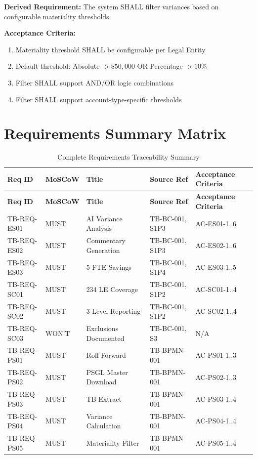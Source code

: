 \textbf{Derived Requirement:} The system SHALL filter variances based on 
configurable materiality thresholds.

\textbf{Acceptance Criteria:}
\begin{enumerate}[label=AC-PS05-\arabic*:]
    \item Materiality threshold SHALL be configurable per Legal Entity
    \item Default threshold: Absolute $> \$50,000$ OR Percentage $> 10\%$
    \item Filter SHALL support AND/OR logic combinations
    \item Filter SHALL support account-type-specific thresholds
\end{enumerate}

\section{Requirements Summary Matrix}
\label{sec:req-summary}

\begin{longtable}{p{2cm} p{1.2cm} p{4cm} p{3cm} p{2.5cm}}
\caption{Complete Requirements Traceability Summary} \\
\toprule
\textbf{Req ID} & \textbf{MoSCoW} & \textbf{Title} & \textbf{Source Ref} & \textbf{Acceptance Criteria} \\
\midrule
\endfirsthead
\toprule
\textbf{Req ID} & \textbf{MoSCoW} & \textbf{Title} & \textbf{Source Ref} & \textbf{Acceptance Criteria} \\
\midrule
\endhead
\rowcolor{sapblue!5}
TB-REQ-ES01 & MUST & AI Variance Analysis & TB-BC-001, S1P3 & AC-ES01-1..6 \\
TB-REQ-ES02 & MUST & Commentary Generation & TB-BC-001, S1P3 & AC-ES02-1..6 \\
\rowcolor{sapblue!5}
TB-REQ-ES03 & MUST & 5 FTE Savings & TB-BC-001, S1P4 & AC-ES03-1..5 \\
TB-REQ-SC01 & MUST & 234 LE Coverage & TB-BC-001, S1P2 & AC-SC01-1..4 \\
\rowcolor{sapblue!5}
TB-REQ-SC02 & MUST & 3-Level Reporting & TB-BC-001, S1P2 & AC-SC02-1..4 \\
TB-REQ-SC03 & WON'T & Exclusions Documented & TB-BC-001, S3 & N/A \\
\rowcolor{sapblue!5}
TB-REQ-PS01 & MUST & Roll Forward & TB-BPMN-001 & AC-PS01-1..3 \\
TB-REQ-PS02 & MUST & PSGL Master Download & TB-BPMN-001 & AC-PS02-1..3 \\
\rowcolor{sapblue!5}
TB-REQ-PS03 & MUST & TB Extract & TB-BPMN-001 & AC-PS03-1..4 \\
TB-REQ-PS04 & MUST & Variance Calculation & TB-BPMN-001 & AC-PS04-1..4 \\
\rowcolor{sapblue!5}
TB-REQ-PS05 & MUST & Materiality Filter & TB-BPMN-001 & AC-PS05-1..4 \\
\bottomrule
\end{longtable}

